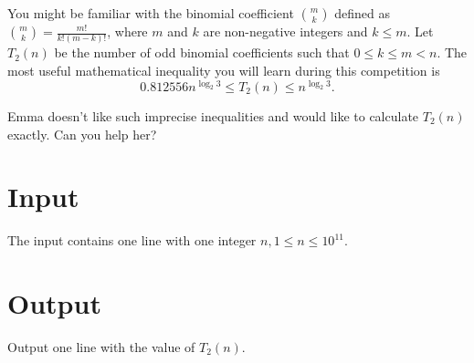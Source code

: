 


\noindent
You might be familiar with the binomial coefficient ${m \choose k}$ defined as ${m \choose k} =
\frac{m!}{k!(m-k)!}$, where $m$ and $k$ are non-negative integers and $k \leq m$. Let $T_2(n)$ be
the number of odd binomial coefficients such that $0 \le k \le m < n$. The most useful mathematical
inequality you will learn during this competition is
$$0.812556 n^{\log_2 3} \le T_2(n) \le n^{\log_2 3}.$$

Emma doesn't like such imprecise inequalities and would like to calculate $T_2(n)$ exactly. Can you
help her?

\section*{Input}
The input contains one line with one integer $n, 1 \leq n \le 10^{11}$.

\section*{Output}
Output one line with the value of $T_2(n)$.
